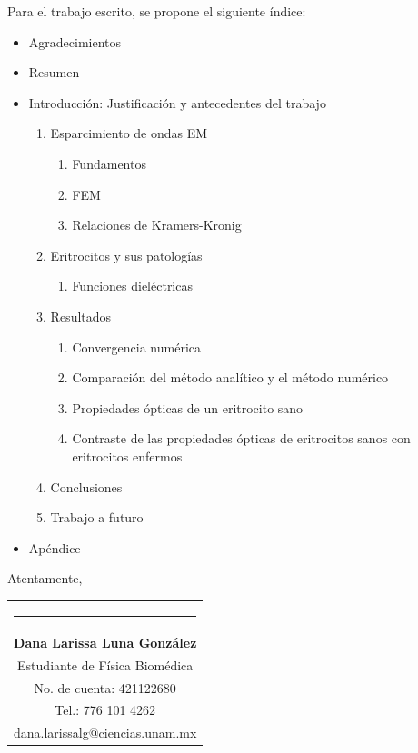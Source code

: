 \documentclass[11pt,letterpaper]{article}
\begin{document}
	Para el trabajo escrito, se propone el siguiente índice:
	\begin{itemize}
		\item  Agradecimientos
		\item  Resumen
		\item  Introducción: Justificación y antecedentes del trabajo
		\begin{enumerate}
			\item Esparcimiento de ondas EM
			\begin{enumerate}
				\item Fundamentos
				\item FEM
				\item Relaciones de Kramers-Kronig
			\end{enumerate}
			\item Eritrocitos y sus patologías
			\begin{enumerate}
				\item Funciones dieléctricas
			\end{enumerate}
			\item Resultados
			\begin{enumerate}
				\item Convergencia numérica
				\item Comparación del método analítico y el método numérico
				\item Propiedades ópticas de un eritrocito sano
				\item  Contraste de las propiedades ópticas de eritrocitos sanos con eritrocitos enfermos
			\end{enumerate}
			\item Conclusiones
			\item Trabajo a futuro	
		\end{enumerate}
		\item Apéndice		
	\end{itemize}
	\newpage
	Atentamente,
	
	
	\bigskip
	
	{\vspace{2.55cm}\begin{tabular} { c}
			\setlength{\tabcolsep}{15pt}
			\renewcommand{\arraystretch}{1}
			\noindent\rule{5.5cm}{0.4pt}\qquad \\
			
			\qquad  \textbf{Dana Larissa Luna González} \qquad \\
			\qquad Estudiante de Física Biomédica  \qquad \\ \qquad 
			No. de cuenta: 421122680\qquad \\  
			\qquad  Tel.: 776 101 4262 \qquad \\
			\qquad dana.larissalg@ciencias.unam.mx \qquad \\
			
		\end{tabular}
	}
	
\end{document}

